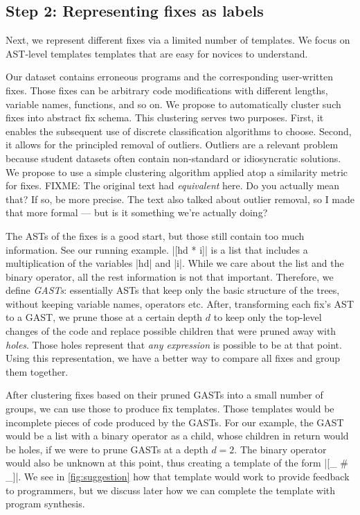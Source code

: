 \subsection{Step 2: Representing fixes as labels}
\label{subsec:step2}

Next, we represent different fixes via a limited number of templates. We focus
on AST-level templates templates that are easy for novices to understand.

 Our dataset contains erroneous programs and the
corresponding user-written fixes. Those fixes can be arbitrary code
modifications with different lengths, variable names, functions, and so on. We
propose to automatically cluster such fixes into abstract fix schema. This
clustering serves two purposes. First, it enables the subsequent use of discrete
classification algorithms to choose. Second, it allows for the principled
removal of outliers. Outliers are a relevant problem because student datasets
often contain non-standard or idiosyncratic solutions. We propose to use a
simple clustering algorithm applied atop a similarity metric for fixes.
%
FIXME: The original text had \emph{equivalent} here. Do you actually mean
that? If so, be more precise. The text also talked about outlier removal,
so I made that more formal --- but is it something we're actually doing?

 The ASTs of the fixes is a good start, but those still contain too much
information. See our running example. |[hd * i]| is a list that includes a multiplication of the variables |hd| and |i|.
While we care about the list and the binary operator, all the rest information is not that important. Therefore, we
define \emph{GASTs}: essentially ASTs that keep only the basic structure of the trees, without keeping variable names,
operators etc. After, transforming each fix’s AST to a GAST, we prune those at a certain depth $d$ to keep only the
top-level changes of the code and replace possible children that were pruned away with \emph{holes}. Those holes
represent that \emph{any expression} is possible to be at that point. Using this representation, we have a better way to
compare all fixes and group them together.

 After clustering fixes based on their pruned GASTs into a small number of groups, we can use those
to produce fix templates. Those templates would be incomplete pieces of code produced by the GASTs. For our example, the
GAST would be a list with a binary operator as a child, whose children in return would be holes, if we were to prune
GASTs at a depth $d = 2$. The binary operator would also be unknown at this point, thus creating a template of the form
|[_ # _]|. We see in \autoref{fig:suggestion} how that template would work to provide feedback to programmers, but we
discuss later how we can complete the template with program synthesis.

